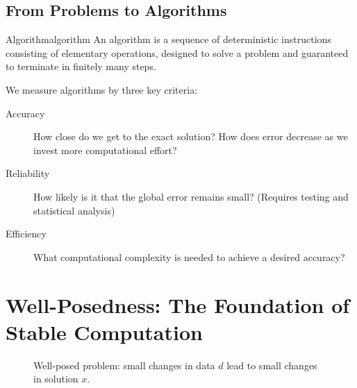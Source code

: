 \subsection{From Problems to Algorithms}
\label{subsec:algorithms}

\begin{definition}{Algorithm}{algorithm}
    An algorithm is a sequence of deterministic instructions consisting of elementary operations, designed to solve a problem and guaranteed to terminate in finitely many steps.
\end{definition}

We measure algorithms by three key criteria:
\begin{description}
    \item[Accuracy] How close do we get to the exact solution? How does error decrease as we invest more computational effort?
    \item[Reliability] How likely is it that the global error remains small? (Requires testing and statistical analysis)
    \item[Efficiency] What computational complexity is needed to achieve a desired accuracy?
\end{description}

\section{Well-Posedness: The Foundation of Stable Computation}
\label{sec:wellposed}

\begin{figure}[ht]
    \centering
    \caption{Well-posed problem: small changes in data $d$ lead to small changes in solution $x$.}
    \label{fig:wellposed}
\end{figure}

